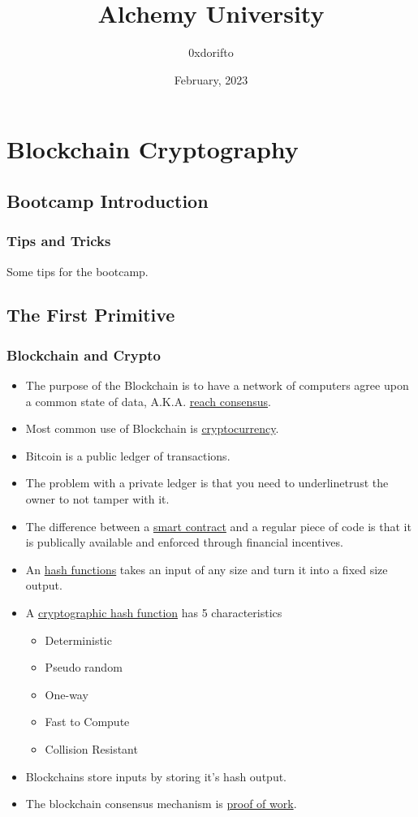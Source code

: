 \documentclass[a4paper, oneside]{book}
\title{Alchemy University}
\author{0xdorifto}
\date{February, 2023}
\begin{document}
\maketitle

\tableofcontents

\chapter{Blockchain Cryptography}

\section{Bootcamp Introduction}

\subsection{Tips and Tricks}

Some tips for the bootcamp.

\section{The First Primitive}

\subsection{Blockchain and Crypto}

\begin{itemize}
	\item The purpose of the Blockchain is to have a network of computers agree upon a common state of data, A.K.A. \underline{reach consensus}.
	\item Most common use of Blockchain is \underline{cryptocurrency}.
	\item Bitcoin is a public ledger of transactions.
	\item The problem with a private ledger is that you need to underline{trust} the owner to not tamper with it.
	\item The difference between a \underline{smart contract} and a regular piece of code is that it is publically available and enforced through financial incentives.
	\item An \underline{hash functions} takes an input of any size and turn it into a fixed size output.
	\item A \underline{cryptographic hash function} has 5 characteristics 
	\begin{itemize}
		\item Deterministic
		\item Pseudo random
		\item One-way
		\item Fast to Compute
		\item Collision Resistant
	\end{itemize}
	\item Blockchains store inputs by storing it's hash output.
	\item The blockchain consensus mechanism is \underline{proof of work}.
\end{itemize}
\end{document}
